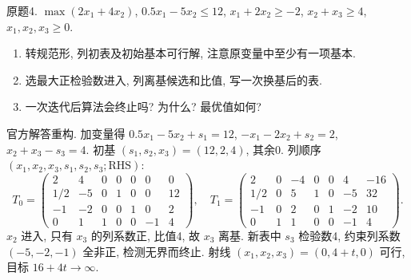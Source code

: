 \begin{exercise}\label{ass:15053-rec2-q4}
原题4. $\max(2x_1+4x_2)$, $0.5x_1-5x_2\le12$, $x_1+2x_2\ge-2$, $x_2+x_3\ge4$, $x_1,x_2,x_3\ge0$.
\begin{enumerate}[label=(\alph*)]
\item 转规范形, 列初表及初始基本可行解, 注意原变量中至少有一项基本.
\item 选最大正检验数进入, 列离基候选和比值, 写一次换基后的表.
\item 一次迭代后算法会终止吗? 为什么? 最优值如何?
\end{enumerate}
\end{exercise}
\begin{solution}
官方解答重构. 加变量得 $0.5x_1-5x_2+s_1=12$, $-x_1-2x_2+s_2=2$, $x_2+x_3-s_3=4$. 初基 $(s_1,s_2,x_3)=(12,2,4)$, 其余0. 列顺序 $(x_1,x_2,x_3,s_1,s_2,s_3;\mathrm{RHS})$:
\[
T_0=\begin{pmatrix}2&4&0&0&0&0&0\\1/2&-5&0&1&0&0&12\\-1&-2&0&0&1&0&2\\0&1&1&0&0&-1&4\end{pmatrix},
\quad
T_1=\begin{pmatrix}2&0&-4&0&0&4&-16\\1/2&0&5&1&0&-5&32\\-1&0&2&0&1&-2&10\\0&1&1&0&0&-1&4\end{pmatrix}.
\]
$x_2$ 进入, 只有 $x_3$ 的列系数正, 比值4, 故 $x_3$ 离基. 新表中 $s_3$ 检验数4, 约束列系数 $(-5,-2,-1)$ 全非正, 检测无界而终止. 射线 $(x_1,x_2,x_3)=(0,4+t,0)$ 可行, 目标 $16+4t\to\infty$.
\end{solution}

